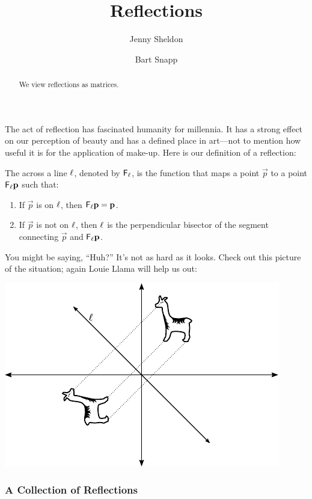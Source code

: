 \documentclass{ximera}
\author{Jenny Sheldon \and Bart Snapp}
\title{Reflections}
\begin{document}
\begin{abstract}
  We view reflections as matrices.
\end{abstract}
\maketitle

The act of reflection has fascinated humanity for millennia.  It has a
strong effect on our perception of beauty and has a defined place in
art---not to mention how useful it is for the application
of make-up. Here is our definition of a reflection:

\begin{definition}
The  across a line $\ell$, denoted by $\mathsf{F}_\ell$, is the
function that maps a point $\vec{p}$ to a point $\mathsf{F}_\ell
\mathbf{p}$ such that:
\begin{enumerate}
\item If $\vec{p}$ is on $\ell$, then $\mathsf{F}_\ell \mathbf{p} = \mathbf{p}$.
\item If $\vec{p}$ is not on $\ell$, then $\ell$ is the perpendicular
  bisector of the segment connecting $\vec{p}$ and $\mathsf{F}_\ell \mathbf{p}$. 
\end{enumerate}
\end{definition}

You might be saying, ``Huh?''  It's not as hard as it looks.  Check
out this picture of the situation; again Louie Llama 
will help us out:
\begin{image}
\includegraphics{refIdeaEg.pdf}
\end{image}

\subsubsection{A Collection of Reflections}
\end{document}
